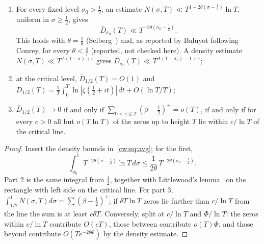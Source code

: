 \begin{proposition}[proved]\label{cw:prop:avg}
\begin{enumerate}
\item For every fixed level $\sigma_0>\frac12$, an estimate $N(\sigma,T)\ll T^{1-2\theta(\sigma-\frac12)}\ln T$, uniform in $\sigma\ge\frac12$, gives
\[
\bar D_{\sigma_0}(T)\ll T^{-2\theta(\sigma_0-\frac12)}.
\]
This holds with $\theta=\frac18$ (Selberg~\cite{Selberg46}) and, as reported by Baluyot following Conrey, for every $\theta<\frac47$ (reported, not checked here). A density estimate $N(\sigma,T)\ll T^{A(1-\sigma)+\varepsilon}$ gives $\bar D_{\sigma_0}(T)\ll T^{A(1-\sigma_0)-1+\varepsilon}$;
\item at the critical level, $\bar D_{1/2}(T)=O(1)$ and $\bar D_{1/2}(T)=\frac1T\int_0^T\ln|\zeta(\tfrac12+it)|\,dt+O(\ln T/T)$;
\item $\bar D_{1/2}(T)\to0$ if and only if $\sum_{0<\gamma\le T}(\beta-\frac12)^+=o(T)$, if and only if for every $c>0$ all but $o(T\ln T)$ of the zeros up to height $T$ lie within $c/\ln T$ of the critical line.
\end{enumerate}
\end{proposition}

\begin{proof}
Insert the density bounds in~\eqref{cw:eq:avg}; for the first,
\[
\int_{\sigma_0}^1T^{-2\theta(\sigma-\frac12)}\ln T\,d\sigma\le\frac1{2\theta}\,T^{-2\theta(\sigma_0-\frac12)}.
\]
Part 2 is the same integral from $\frac12$, together with Littlewood's lemma~\cite{Littlewood24} on the rectangle with left side on the critical line. For part 3, $\int_{1/2}^1N(\sigma,T)d\sigma=\sum(\beta-\frac12)^+$; if $\delta T\ln T$ zeros lie further than $c/\ln T$ from the line the sum is at least $c\delta T$. Conversely, split at $c/\ln T$ and $\Phi/\ln T$: the zeros within $c/\ln T$ contribute $O(cT)$, those between contribute $o(T)\Phi$, and those beyond contribute $O(Te^{-2\theta\Phi})$ by the density estimate.
\end{proof}

